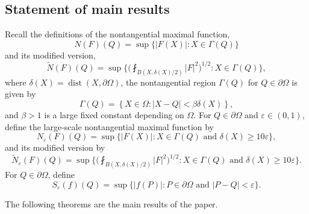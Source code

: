\documentclass[reqno,12pt]{amsart} %
\theoremstyle{definition}
\theoremstyle{remark}
\numberwithin{equation}{section}
\newcommand{\cL}{\mathcal{L}}
\newcommand{\e}{\varepsilon}
\DeclareMathOperator{\dist}{dist}
\begin{document}
\subsection{Statement of main results}
Recall the definitions of the nontangential maximal function,
\begin{equation}\label{NM}
    N(F) (Q)=\sup \big\{ |F(X)|: X \in \Gamma (Q) \big\}
\end{equation}
and its modified version,
\begin{equation}\label{MNM}
    \widetilde{N}(F)(Q) = \sup \bigg\{ \bigg(\fint_{B(X, \delta(X)/2) }|F|^2  \bigg)^{1/2}: X\in \Gamma(Q)\bigg\},
\end{equation}
where $\delta(X) = \dist(X, \partial \Omega)$, the nontangential region $\Gamma(Q)$ for $Q \in  \partial \Omega$ is given by
\begin{equation}\label{def.NTcone}
    \Gamma(Q) = \left\{X\in \Omega: |X - Q| < \beta \delta(X)\right \},
\end{equation}
and $\beta > 1$ is a large fixed constant depending on $\Omega$.
For $Q \in \partial \Omega$ and $\e\in (0, 1)$, define the large-scale nontangential maximal function by
\begin{equation}\label{def.N_e}
    N_\e(F)(Q) = \sup \big\{ |F(X)|: X\in \Gamma(Q)
    \text{ and } \delta (X)\ge 10\e\big\},
\end{equation}
and its modified version by
\begin{equation}\label{def.tN_e}
    \widetilde{N}_\e(F)(Q) = \sup \bigg\{ \bigg(\fint_{B(X, \delta(X)/2) }|F|^2  \bigg)^{1/2}: X\in \Gamma(Q) \text{ and  }
    \delta (X)\ge 10 \e\bigg\}.
\end{equation}
For $Q \in \partial \Omega$, define
\begin{equation}
    S_{\e}(f)(Q) = \sup \big\{ |f(P)|: P\in \partial\Omega \text{ and } |P-Q|< \e\big \}.
\end{equation}

The following theorems are the main results of the paper.
\end{document}
